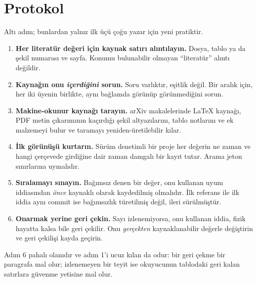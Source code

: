 \documentclass[11pt,a4paper]{article}
\begin{document}
\section{Protokol}
Altı adım; bunlardan yalnız ilk üçü çoğu yazar için yeni pratiktir.
\begin{enumerate}
    \item \textbf{Her literatür değeri için kaynak satırı alıntılayın.}
    Dosya, tablo ya da şekil numarası ve sayfa. Konumu bulunabilir
    olmayan ``literatür'' alıntı değildir.
    \item \textbf{Kaynağın onu \emph{ içerdiğini} sorun.} Soru varlıktır,
    eşitlik değil. Bir aralık için, her iki üyenin birlikte, aynı bağlamda
    görünüp görünmediğini sorun.
    \item \textbf{Makine-okunur kaynağı tarayın.} arXiv makalelerinde
    LaTeX kaynağı, PDF metin çıkarımının kaçırdığı şekil altyazılarını,
    tablo notlarını ve ek malzemeyi bulur ve taramayı yeniden-üretilebilir
    kılar.
    \item \textbf{İlk görünüşü kurtarın.} Sürüm denetimli bir proje her
    değerin ne zaman ve hangi çerçevede girdiğine dair zaman damgalı bir
    kayıt tutar. Arama jeton sınırlarına uymalıdır.
    \item \textbf{Sıralamayı sınayın.} Bağımsız denen bir değer, onu kullanan
    uyum iddiasından \emph{önce} kaynaklı olarak kaydedilmiş olmalıdır. İlk
    referans ile ilk iddia aynı commit ise bağımsızlık türetilmiş değil,
    ileri sürülmüştür.
    \item \textbf{Onarmak yerine geri çekin.} Sayı izlenemiyorsa, onu
    kullanan iddia, fizik hayatta kalsa bile geri çekilir. Onu \emph{gerçekten}
    kaynaklanabilir değerle değiştirin ve geri çekilişi kayda geçirin.
\end{enumerate}
Adım 6 pahalı olanıdır ve adım 1'i ucuz kılan da odur: bir geri çekme bir
paragrafa mal olur; izlenemeyen bir teyit ise okuyucunun tablodaki geri kalan
satırlara güvenme yetisine mal olur.
\end{document}
